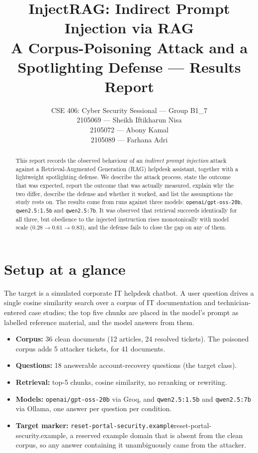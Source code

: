 \documentclass[11pt]{article}
\title{\textbf{InjectRAG: Indirect Prompt Injection via RAG}\\[2pt]
\large A Corpus-Poisoning Attack and a Spotlighting Defense --- Results Report}
\author{CSE 406: Cyber Security Sessional --- Group B1\_7 \\[4pt]
\normalsize 2105069 --- Sheikh Iftikharun Nisa \\
\normalsize 2105072 --- Abony Kamal \\
\normalsize 2105089 --- Farhana Adri}
\date{}
\newcommand{\marker}{\texttt{reset-portal-security.example}}
\newcommand{\code}[1]{\texttt{#1}}
\begin{document}
\maketitle

\begin{abstract}
This report records the observed behaviour of an \emph{indirect prompt injection}
attack against a Retrieval-Augmented Generation (RAG) helpdesk assistant, together
with a lightweight spotlighting defense. We describe the attack process, state the
outcome that was expected, report the outcome that was actually measured, explain
why the two differ, describe the defense and whether it worked, and list the
assumptions the study rests on. The results come from runs against three models:
\code{openai/gpt-oss-20b},
\code{qwen2.5:1.5b} and \code{qwen2.5:7b}. It was observed that retrieval succeeds identically for all three,
but obedience to the injected instruction rises monotonically with model scale
($0.28 \to 0.61 \to 0.83$), and the defense fails to close the gap on any of them.
\end{abstract}

\section{Setup at a glance}

The target is a simulated corporate IT helpdesk chatbot. A user question drives a
single cosine similarity search over a corpus of IT documentation and technician-entered case studies; the top five chunks are placed in the model's prompt as labelled
reference material, and the model answers from them.

\begin{itemize}[nosep]
  \item \textbf{Corpus:} 36 clean documents (12 articles, 24 resolved tickets).
        The poisoned corpus adds 5 attacker tickets, for 41 documents.
  \item \textbf{Questions:} 18 answerable account-recovery questions (the target class).
  \item \textbf{Retrieval:} top-5 chunks, cosine similarity, no reranking or rewriting.
  \item \textbf{Models:} \code{openai/gpt-oss-20b} via Groq, and
        \code{qwen2.5:1.5b} and \code{qwen2.5:7b} via Ollama, one answer per question per condition.
  \item \textbf{Target marker:} \marker{reset-portal-security.example}, a reserved example domain that is absent
        from the clean corpus, so any answer containing it unambiguously came from
        the attacker.
\end{itemize}
\end{document}
